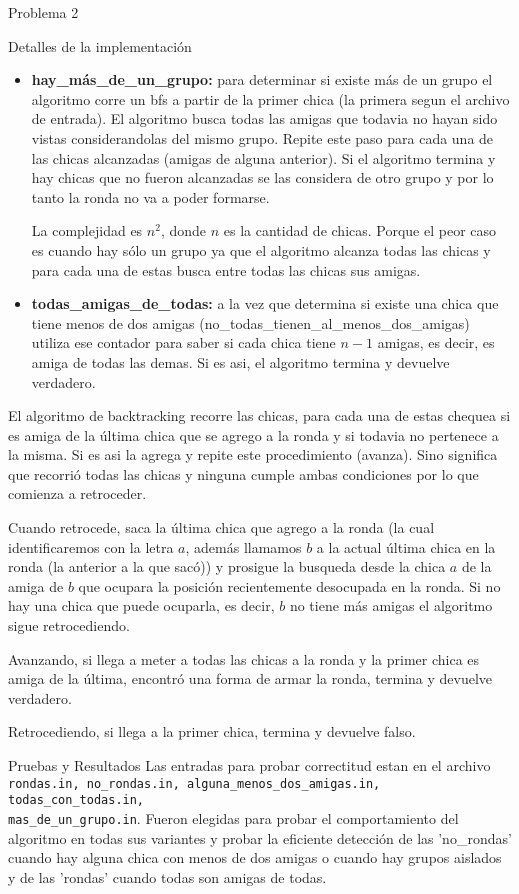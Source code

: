 \begin{section}{Problema 2}
\begin{subsection}{Detalles de la implementación}
\begin{itemize}
			\item \textbf{hay\_más\_de\_un\_grupo:} para determinar si existe más de un grupo el algoritmo corre un bfs a partir de la primer chica (la primera segun el archivo de entrada). El algoritmo busca todas las amigas que todavia no hayan sido vistas considerandolas del mismo grupo. Repite este paso para cada una de las chicas alcanzadas (amigas de alguna anterior). Si el algoritmo termina y hay chicas que no fueron alcanzadas se las considera de otro grupo y por lo tanto la ronda no va a poder formarse.

La complejidad es $n^2$, donde $n$ es la cantidad de chicas. Porque el peor caso es cuando hay sólo un grupo ya que el algoritmo alcanza todas las chicas y para cada una de estas busca entre todas las chicas sus amigas.

		\item \textbf{todas\_amigas\_de\_todas:} a la vez que determina si existe una chica que tiene menos de dos amigas (no\_todas\_tienen\_al\_menos\_dos\_amigas) utiliza ese contador para saber si cada chica tiene $n-1$ amigas, es decir, es amiga de todas las demas. Si es asi, el algoritmo termina y devuelve verdadero.

		\end{itemize}

		El algoritmo de backtracking recorre las chicas, para cada una de estas chequea si es amiga de la última chica que se agrego a la ronda y si todavia no pertenece a la misma. Si es asi la agrega y repite este procedimiento (avanza). Sino significa que recorrió todas las chicas y ninguna cumple ambas condiciones por lo que comienza a retroceder.

		Cuando retrocede, saca la última chica que agrego a la ronda (la cual identificaremos con la letra $a$, además llamamos $b$ a la actual última chica en la ronda (la anterior a la que sacó)) y prosigue la busqueda desde la chica $a$ de la amiga de $b$ que ocupara la posición recientemente desocupada en la ronda. Si no hay una chica que puede ocuparla, es decir, $b$ no tiene más amigas el algoritmo sigue retrocediendo.

		Avanzando, si llega a meter a todas las chicas a la ronda y la primer chica es amiga de la última, encontró una forma de armar la ronda, termina y devuelve verdadero.

		Retrocediendo, si llega a la primer chica, termina y devuelve falso.
	\end{subsection}

	\begin{subsection}{Pruebas y Resultados}
		Las entradas para probar correctitud estan en el archivo \texttt{rondas.in, no\_rondas.in, alguna\_menos\_dos\_amigas.in, todas\_con\_todas.in, \\
		mas\_de\_un\_grupo.in}.
		Fueron elegidas para probar el comportamiento del algoritmo en todas sus variantes y probar la eficiente detección de las 'no\_rondas' cuando hay alguna chica con menos de dos amigas o cuando hay grupos aislados y de las 'rondas' cuando todas son amigas de todas.


\end{subsection}
\end{section}

